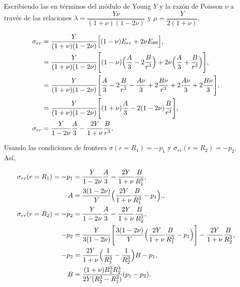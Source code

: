 \documentclass[../main.tex]{subfiles}
\begin{document}
\begin{problema}[4]
	Escribiendo las  en términos del
	módulo de Young \(Y\) y la razón de Poisson \(\nu\) a través de las relaciones
	\(\lambda = \dfrac{Y\nu}{(1 + \nu)(1 - 2\nu)}\) y \(\mu = \dfrac{Y}{2(1 + \nu)}\),

	\begin{align}
		\sigma_{rr} & = \dfrac{Y}{(1 + \nu)(1 - 2\nu)}\Bigl[(1 - \nu)E_{rr} + 2\nu E_{\theta\theta}\Bigr],\nonumber                                                                           \\
		            & = \dfrac{Y}{(1 + \nu)(1 - 2\nu)}\Biggl[(1 - \nu)\Bigl(\dfrac{A}{3} - 2\dfrac{B}{r^{3}}\Bigr) + 2\nu \Bigl(\dfrac{A}{3} + \dfrac{B}{r^{3}}\Bigr)\Biggr],\nonumber        \\
		            & = \dfrac{Y}{(1 + \nu)(1 - 2\nu)}\Biggl[\dfrac{A}{3} - 2\dfrac{B}{r^{3}} - \dfrac{A\nu}{3} + 2\dfrac{B\nu}{r^{3}} + 2\dfrac{A\nu}{3} + 2\dfrac{B\nu}{3}\Biggr],\nonumber \\
		            & = \dfrac{Y}{(1 + \nu)(1 - 2\nu)}\Biggl[(1 + \nu)\dfrac{A}{3} - 2(1 - 2\nu)\dfrac{B}{r^{3}}\Biggr],\nonumber                                                             \\
		\sigma_{rr} & = \dfrac{Y}{1 - 2\nu}\dfrac{A}{3} - \dfrac{2Y}{1 + \nu}\dfrac{B}{r^{3}}.\label{eq:sigma_rr-young-poisson}
	\end{align}

	Usando las condiciones de frontera \(\sigma(r = R_{1}) = -p_{1}\) y \(\sigma_{rr}(r = R_{2}) = -p_{2}\). Así,

	\begin{align}
		\sigma_{rr}(r = R_{1}) = -p_{1} & = \dfrac{Y}{1 - 2\nu}\dfrac{A}{3} - \dfrac{2Y}{1 + \nu}\dfrac{B}{R_{1}^{3}},\nonumber                                                                              \\
		A                               & = \dfrac{3(1 - 2\nu)}{Y}\Bigl(\dfrac{2Y}{1 + \nu}\dfrac{B}{R_{1}^{3}} - p_{1}\Bigr).\label{eq:coeff-A},                                                            \\
		\sigma_{rr}(r = R_{2}) = -p_{2} & = \dfrac{Y}{1 - 2\nu}\dfrac{A}{3} - \dfrac{2Y}{1 + \nu}\dfrac{B}{R_{2}^{3}},\nonumber                                                                              \\
		-p_{2}                          & = \dfrac{Y}{3(1 - 2\nu)}\Biggl[\dfrac{3(1 - 2\nu)}{Y}\Bigl(\dfrac{2Y}{1 + \nu}\dfrac{B}{R_{1}^{3}} - p_{1}\Bigr)\Biggr] - \dfrac{2Y}{1 + \nu}\dfrac{B}{R_{2}^{3}}, \\
		- p_{2}                         & = \dfrac{2Y}{1 + \nu}\Bigl(\dfrac{1}{R_{1}^{3}} - \dfrac{1}{R_{2}^{3}}\Bigr)B - p_{1},\nonumber                                                                    \\
		B                               & = \dfrac{(1 + \nu)R_{1}^{3}R_{2}^{3}}{2Y(R_{2}^{3} - R_{1}^{3})}(p_{1} - p_{2}).\label{eq:coeff-B}
	\end{align}


\end{problema}
\end{document}
